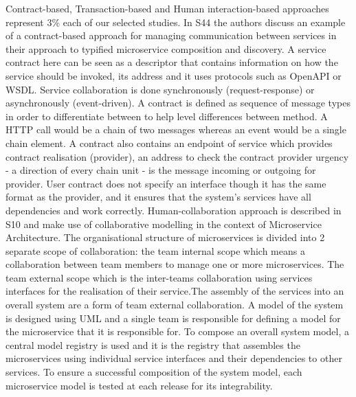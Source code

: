 \documentclass{article}
\begin{document}
\begin{multicols}{2}
Contract-based, Transaction-based and Human interaction-based approaches represent 3\% each of our selected studies. In S44 the authors discuss an example of a contract-based approach for managing communication between services in their approach to typified microservice composition and discovery. A service contract here can be seen as a descriptor that contains information on how the service should be invoked, its address and it uses protocols such as OpenAPI or WSDL. Service collaboration is done synchronously (request-response) or asynchronously (event-driven). A contract is defined as sequence of message types in order to differentiate between to help level differences between method.  A HTTP call would be a chain of two messages whereas an event would be a single chain element. A contract also contains an endpoint of service which provides contract realisation (provider), an address to check the contract provider urgency - a direction of every chain unit - is the message incoming or outgoing for provider. User contract does not specify an interface though it has the same format as the provider, and it ensures that the system’s services have all dependencies and work correctly.
Human-collaboration approach is described in S10 and make use of collaborative modelling in the context of Microservice Architecture. The organisational structure  of microservices is divided into 2 separate scope of collaboration: the team internal scope which means a collaboration between team members to manage one or more microservices. The team external scope which is the inter-teams collaboration using services interfaces for the realisation of their service.The assembly of the services into an overall system are a form of team external collaboration. A model of the system is designed using UML and a single team is responsible for defining a model for the microservice that it is responsible for. To compose an overall system model, a central model registry is used and it is the registry that assembles the microservices using individual service interfaces and their dependencies to other services. To ensure a successful composition of the system model, each microservice model is tested at each release for its integrability.

\end{multicols}
\end{document}
